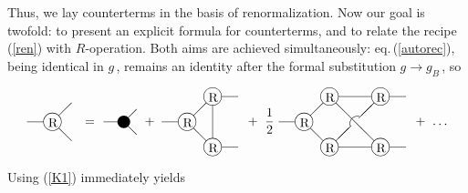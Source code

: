 \documentclass[a4paper,12pt]{article}
\begin{document}
Thus, we lay counterterms in the basis of renormalization.
Now our goal is twofold: to present an explicit formula for counterterms,
and to relate the recipe (\ref{ren}) with $R$-operation.
Both aims are achieved simultaneously: eq.\,(\ref{autorec}),
being identical in $g$\,, remains an identity after
the formal substitution $g\rightarrow g_B$\,, so
\begin{equation}
\label{main}
\parbox{1.5cm}{
\begin{picture}(35,60)
\put(20,30){\circle{14}}
\put(0,30){\line(1,0){13}}
\put(25,35){\line(1,1){10}}
\put(25,25){\line(1,-1){10}}
\put(16.7,26){R}
\end{picture}
} =
\parbox{1.2cm}{
\begin{picture}(30,60)
\put(20,30){\circle*{10}}
\put(4,30){\line(1,0){15}}
\put(20,30){\line(1,1){10}}
\put(20,30){\line(1,-1){10}}
\end{picture}
} + \
\parbox{2.3cm}{
\begin{picture}(60,60)
\put(20,30){\circle{14}}
\put(40,10){\circle{14}}
\put(40,50){\circle{14}}
\put(0,30){\line(1,0){13}}
\put(47,50){\line(1,0){13}}
\put(47,10){\line(1,0){13}}
\put(25,35){\line(1,1){10}}
\put(25,25){\line(1,-1){10}}
\put(40,17){\line(0,1){26.5}}
\put(16.7,26){R}
\put(36.7,6){R}
\put(36.7,46){R}
\end{picture}
} + \ \frac{1}{2} \
\parbox{3.7cm}{
\begin{picture}(100,60)
\put(20,30){\circle{14}}
\put(40,10){\circle{14}}
\put(40,50){\circle{14}}
\put(80,10){\circle{14}}
\put(80,50){\circle{14}}
\put(87,50){\line(1,0){13}}
\put(87,10){\line(1,0){13}}
\put(0,30){\line(1,0){13}}
\put(47,50){\line(1,0){26}}
\put(47,10){\line(1,0){26}}
\put(25,35){\line(1,1){10}}
\put(25,25){\line(1,-1){10}}
\put(45,15){\line(1,1){12}}
\put(75,45){\line(-1,-1){12}}
\put(45,45){\line(1,-1){30}}
\put(63.5,27){\oval(15,15)[tl]}
\put(16.7,26){R}
\put(36.7,6){R}
\put(36.7,46){R}
\put(76.7,6){R}
\put(76.7,46){R}
\end{picture}
} + \ \ldots
\end{equation}
Using (\ref{K1}) immediately yields
\end{document}
